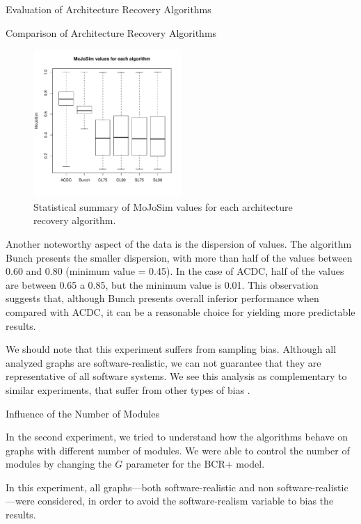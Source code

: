 \documentclass[11pt,twocolumn,a4paper,english]{article}
\begin{document}
\begin{section}{Evaluation of Architecture Recovery Algorithms}
\begin{subsection}{Comparison of Architecture Recovery Algorithms}
	\begin{figure}[htbp]
		\centering
			\includegraphics[width=0.5\textwidth]{figures/exp-algorithms}
		\caption{Statistical summary of MoJoSim values for each architecture recovery algorithm.}
		\label{fig:exp-algorithms}
	\end{figure}
	
	Another noteworthy aspect of the data is the dispersion of values. The algorithm Bunch presents the smaller dispersion, with more than half of the values between 0.60 and 0.80 (minimum value = 0.45). In the case of ACDC, half of the values are between 0.65 a 0.85, but the minimum value is 0.01. This observation suggests that, although Bunch presents overall inferior performance when compared with ACDC, it can be a reasonable choice for yielding more predictable results.
	
	We should note that this experiment suffers from sampling bias. Although all analyzed graphs are software-realistic, we can not guarantee that they are representative of all software systems. We see this analysis as complementary to similar experiments, that suffer from other types of bias \cite{Wu2005,Bittencourt2009,Andritsos2005}.
	
\end{subsection}	

\begin{subsection}{Influence of the Number of Modules} \label{sec:exp2}
	
	In the second experiment, we tried to understand how the algorithms behave on graphs with different number of modules. We were able to control the number of modules by changing the $G$ parameter for the BCR+ model.
	
	In this experiment, all graphs---both software-realistic and non software-realistic---were considered, in order to avoid the software-realism variable to bias the results.
		

\end{subsection}
\end{section}
\end{document}
